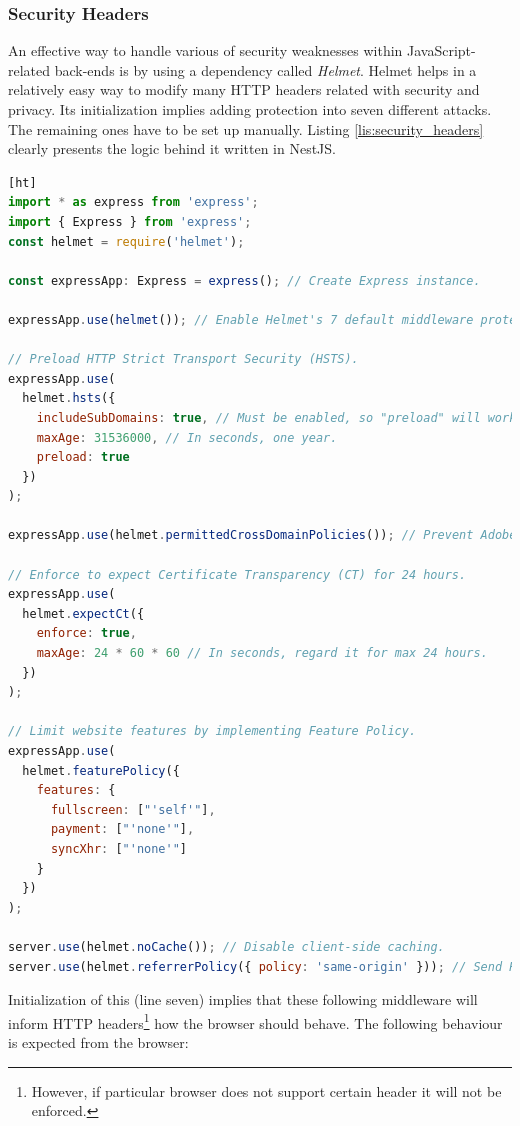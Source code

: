\documentclass{article} %
\begin{document}
\subsubsection{Security Headers}
An effective way to handle various of security weaknesses within JavaScript-related back-ends is by using a dependency called \textit{Helmet}. Helmet helps in a relatively easy way to modify many HTTP headers related with security and privacy. Its initialization implies adding protection into seven different attacks. The remaining ones have to be set up manually. Listing \ref{lis:security_headers} clearly presents the logic behind it written in NestJS.
\begin{lstlisting}[language=JavaScript,firstnumber=1,label={lis:security_headers},caption={Declaration of security headers in NestJS.}][ht]
import * as express from 'express';
import { Express } from 'express';
const helmet = require('helmet');

const expressApp: Express = express(); // Create Express instance.

expressApp.use(helmet()); // Enable Helmet's 7 default middleware protections, i.e. dnsPrefetchControl, frameguard, hidePoweredBy, hsts, ieNoOpen, noSniff and xssFilter.

// Preload HTTP Strict Transport Security (HSTS).
expressApp.use(
  helmet.hsts({
    includeSubDomains: true, // Must be enabled, so "preload" will work.
    maxAge: 31536000, // In seconds, one year.
    preload: true
  })
);

expressApp.use(helmet.permittedCrossDomainPolicies()); // Prevent Adobe Flash and Adobe Acrobat from loading content.

// Enforce to expect Certificate Transparency (CT) for 24 hours.
expressApp.use(
  helmet.expectCt({
    enforce: true,
    maxAge: 24 * 60 * 60 // In seconds, regard it for max 24 hours.
  })
);

// Limit website features by implementing Feature Policy.
expressApp.use(
  helmet.featurePolicy({
    features: {
      fullscreen: ["'self'"],
      payment: ["'none'"],
      syncXhr: ["'none'"]
    }
  })
);

server.use(helmet.noCache()); // Disable client-side caching.
server.use(helmet.referrerPolicy({ policy: 'same-origin' })); // Send Referer header only for pages on the same origin.
\end{lstlisting}
Initialization of this  (line seven) implies that these following middleware will inform HTTP headers\footnote{However, if particular browser does not support certain header it will not be enforced.} how the browser should behave. The following behaviour is expected from the browser:
\end{document}
